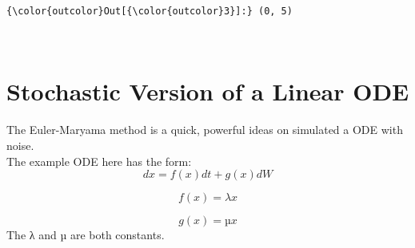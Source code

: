 \documentclass{article}
\begin{document}
            \begin{Verbatim}[commandchars=\\\{\}]
{\color{outcolor}Out[{\color{outcolor}3}]:} (0, 5)
\end{Verbatim}
        
    \begin{center}
    \end{center}
    { \hspace*{\fill} \\}
    
    \section{Stochastic Version of a Linear
ODE}\label{stochastic-version-of-a-linear-ode}

    The Euler-Maryama method is a quick, powerful ideas on simulated a ODE
with noise.\\The example ODE here has the form:
\[ dx = f(x)dt + g(x)dW \]

\[ f(x) = λx \]

\[ g(x) = µx \] The λ and µ are both constants.
\end{document}
